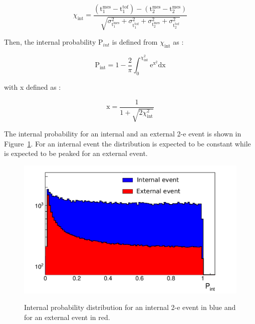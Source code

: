 \documentclass[main.tex]{subfiles}
\begin{document}
\begin{equation}
\chi_{\text{int}} = \frac{(\text{t}_\text{1}^{\text{mes}} - \text{t}_\text{1}^{\text{tof}}) - (\text{t}_\text{2}^{\text{mes}} - \text{t}_\text{2}^{\text{mes}} ) }{\sqrt{ \sigma^{\text{2}}_{\text{t}_\text{1}^{\text{mes}}} + \sigma^{\text{2}}_{\text{t}_\text{1}^{\text{tof}}} + \sigma^{\text{2}}_{\text{t}_\text{2}^{\text{mes}}} + \sigma^{\text{2}}_{\text{t}_\text{2}^{\text{tof}}}  }}
\end{equation}


\NI Then, the internal probability P$_{int}$ is defined from $\chi_{\text{int}}$ as : 


\begin{equation}\label{eq:probaDef}
\text{P}_{\text{int}} = \text{1} - \frac{\text{2}}{\pi} \int_\text{0}^{\chi^\text{2}_{\text{int}}} \text{e}^{\text{x}^\text{2}} \text{dx}
\end{equation}


\NI with x defined as :

\begin{equation}
\text{x} = \frac{\text{1}}{\text{1}+\sqrt{\text{2}\chi^\text{2}_{\text{int}}}}
\end{equation}


\NI The internal probability for an internal and an external 2-e event is shown in Figure~\ref{PintforIntandExt}. For an internal event the distribution is expected to be constant while is expected to be peaked for an external event.


\begin{figure}[h!]
\centering
\includegraphics[scale=0.55]{pictures/Chap6/Pint_explication.pdf}
\label{PintforIntandExt}
\caption{Internal probability distribution for an internal 2-e event in blue and for an external event in red.}
\end{figure}
\end{document}
